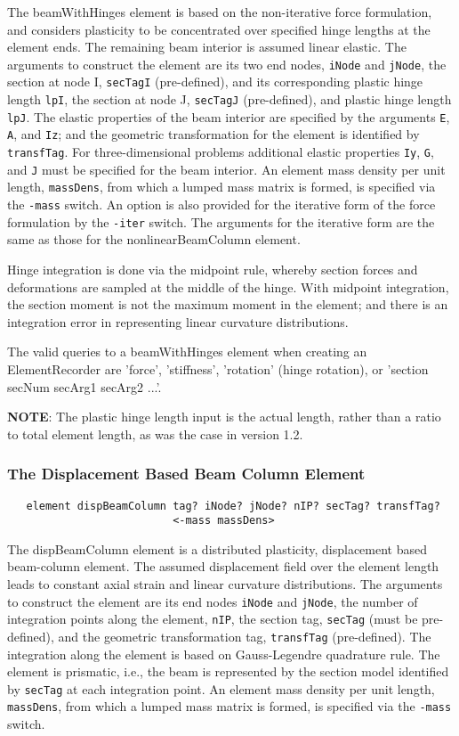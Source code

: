 \documentclass[12pt]{article}
\begin{document}
\noindent The beamWithHinges element is based on the non-iterative force
formulation, and considers plasticity to be concentrated over
specified hinge lengths at the element ends. The remaining beam
interior is assumed linear elastic. The arguments to
construct the element are its two end nodes, {\tt iNode}
and {\tt jNode}, the section at node I, {\tt secTagI} (pre-defined),
and its corresponding plastic hinge length {\tt lpI}, the section at node J,
{\tt secTagJ} (pre-defined), and plastic hinge length {\tt lpJ}.
The elastic properties of the beam interior are specified by the
arguments {\tt E}, {\tt A}, and {\tt Iz}; and the geometric transformation
for the element is identified by {\tt transfTag}.
For three-dimensional problems additional elastic properties {\tt Iy},
{\tt G}, and {\tt J} must be specified for the beam interior.
An element mass density per unit length, {\tt massDens}, from which a
lumped mass matrix 
is formed, is specified via the {\tt -mass} switch. An option is also
provided for the iterative form of the force formulation by the
{\tt -iter} switch. The arguments for the iterative form are the same as
those for the nonlinearBeamColumn element.

Hinge integration is done via the midpoint rule, whereby section forces
and deformations are sampled at the middle of the hinge. With midpoint
integration, the section moment is not the maximum moment in the element;
and there is an integration error in representing linear curvature
distributions.

The valid queries to a beamWithHinges element when creating an
ElementRecorder are 'force', 'stiffness', 'rotation' (hinge rotation),
or 'section secNum secArg1 secArg2 ...'. 

{\bf NOTE}: The plastic hinge length input is the actual length, rather
than a ratio to total element length, as was the case in version 1.2.

\subsubsection{The Displacement Based Beam Column Element}
{\sf\small
\begin{verbatim}
   element dispBeamColumn tag? iNode? jNode? nIP? secTag? transfTag?
                          <-mass massDens>
\end{verbatim}
}

\noindent The dispBeamColumn element is a distributed plasticity, displacement
based beam-column element. The assumed displacement field over the element
length leads to constant axial strain and linear curvature distributions.
The arguments to construct the element
are its end nodes {\tt iNode} and {\tt jNode}, the number of
integration points along the element, {\tt nIP}, the section tag,
{\tt secTag} (must be pre-defined), and the geometric transformation tag,
{\tt transfTag} (pre-defined). The integration along the element is based on
Gauss-Legendre quadrature rule. The element is prismatic, i.e., the beam is
represented by the
section  model identified by {\tt secTag} at each integration point. An
element mass density per unit length, {\tt massDens}, from which a lumped
mass matrix is formed, is specified via the {\tt -mass} switch.
\end{document}
